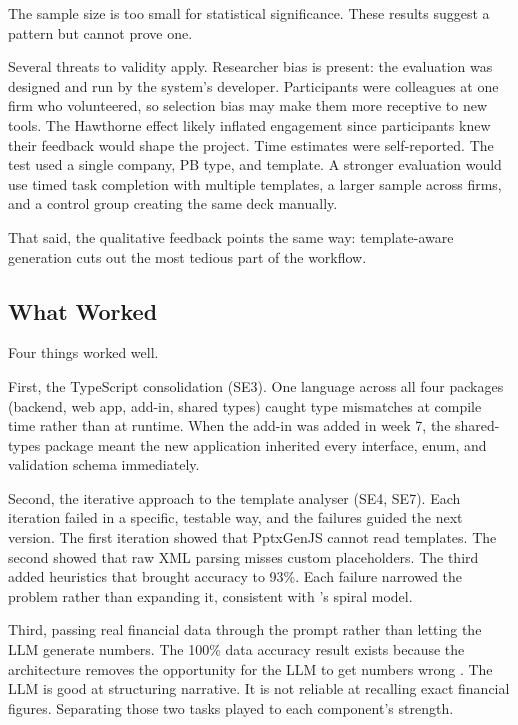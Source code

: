 The sample size is too small for statistical significance. These results suggest a pattern but cannot prove one.

Several threats to validity apply. Researcher bias is present: the evaluation was designed and run by the system's developer. Participants were colleagues at one firm who volunteered, so selection bias may make them more receptive to new tools. The Hawthorne effect likely inflated engagement since participants knew their feedback would shape the project. Time estimates were self-reported. The test used a single company, PB type, and template. A stronger evaluation would use timed task completion with multiple templates, a larger sample across firms, and a control group creating the same deck manually.

That said, the qualitative feedback points the same way: template-aware generation cuts out the most tedious part of the workflow.

\subsection{What Worked}

Four things worked well.

First, the TypeScript consolidation (SE3). One language across all four packages (backend, web app, add-in, shared types) caught type mismatches at compile time rather than at runtime. When the add-in was added in week 7, the shared-types package meant the new application inherited every interface, enum, and validation schema immediately.

Second, the iterative approach to the template analyser (SE4, SE7). Each iteration failed in a specific, testable way, and the failures guided the next version. The first iteration showed that PptxGenJS cannot read templates. The second showed that raw XML parsing misses custom placeholders. The third added heuristics that brought accuracy to 93\%. Each failure narrowed the problem rather than expanding it, consistent with \textcite{boehm1988}'s spiral model.

Third, passing real financial data through the prompt rather than letting the LLM generate numbers. The 100\% data accuracy result exists because the architecture removes the opportunity for the LLM to get numbers wrong \parencite{huang2024}. The LLM is good at structuring narrative. It is not reliable at recalling exact financial figures. Separating those two tasks played to each component's strength.

